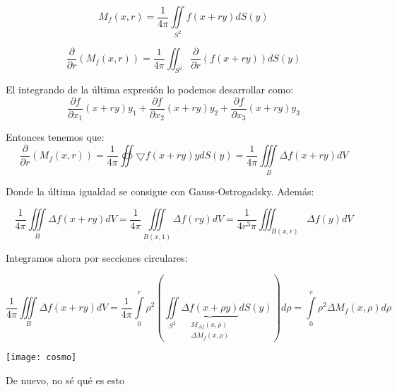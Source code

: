 \documentclass[openany]{book}
\begin{document}
$$ M_{f}(x,r) = \dfrac{1}{4 \pi} \iint\limits_{S^2} f(x+ry)dS(y) $$

$$ \dfrac{\partial }{\partial r} (M_{f}(x,r)) = \dfrac{1}{4\pi} \iint _{S^2} \dfrac{\partial }{\partial r}(f(x+ry))dS(y) $$

El integrando de la última expresión lo podemos desarrollar como:
$$ \dfrac{\partial f}{\partial x_1}(x+ry)y_1+ \dfrac{\partial f}{\partial x_2}(x+ry)y_2+ \dfrac{\partial f}{\partial x_3}(x+ry)y_3 $$

Entonces tenemos que:
$$ \dfrac{\partial }{\partial r} (M_{f}(x,r)) = \dfrac{1}{4\pi} \oiint   \bigtriangledown f(x+ry)ydS(y) = \dfrac{1}{4\pi} \iiint\limits_{B}\Delta f(x+ry)dV $$

Donde la última igualdad se consigue con Gauss-Ostrogadsky. Además:

$$ \dfrac{1}{4\pi} \iiint\limits_{B}\Delta f(x+ry)dV = \dfrac{1}{4\pi}\iiint\limits_{B(x,1)} \Delta f(ry)dV = \dfrac{1}{4 r^3\pi} \iiint _{B(x,r)}\Delta f(y)dV $$

Integramos ahora por secciones circulares:

$$ \dfrac{1}{4\pi} \iiint\limits_{B}\Delta f(x+ry)dV  = \dfrac{1}{4\pi} \int\limits_{0}^{r} \rho^2 \left( \iint\limits_{S^2} \underbrace{\Delta f(x+\rho y)} _{\substack{M_{\Delta f}(x,\rho)\\\Delta M_{f}(x,\rho)}}dS(y) \right)d\rho = \int\limits_{0}^{r}\rho^2 \Delta M_{f}(x,\rho)d\rho $$


\begin{minipage}[l]{0.1\textwidth}
  \texttt{[image: cosmo]}
  \end{minipage}
  \begin{minipage}[l]{0.8\textwidth}
  De nuevo, no sé qué es esto
\end{minipage}
\end{document}
